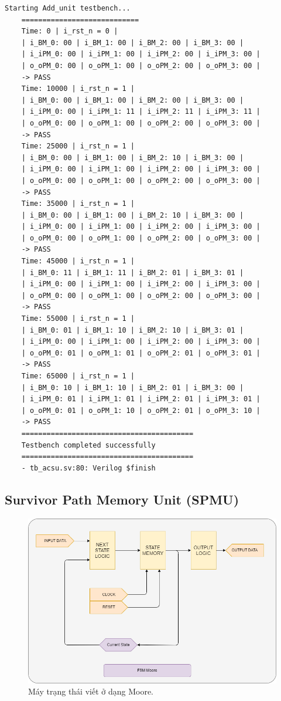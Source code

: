 \begin{lstlisting}[style=StyleResult, language=Result]
	Starting Add_unit testbench...
	============================
	Time: 0 | i_rst_n = 0 | 
	| i_BM_0: 00 | i_BM_1: 00 | i_BM_2: 00 | i_BM_3: 00 |
	| i_iPM_0: 00 | i_iPM_1: 00 | i_iPM_2: 00 | i_iPM_3: 00 |
	| o_oPM_0: 00 | o_oPM_1: 00 | o_oPM_2: 00 | o_oPM_3: 00 |
	-> PASS
	Time: 10000 | i_rst_n = 1 | 
	| i_BM_0: 00 | i_BM_1: 00 | i_BM_2: 00 | i_BM_3: 00 |
	| i_iPM_0: 00 | i_iPM_1: 11 | i_iPM_2: 11 | i_iPM_3: 11 |
	| o_oPM_0: 00 | o_oPM_1: 00 | o_oPM_2: 00 | o_oPM_3: 00 |
	-> PASS
	Time: 25000 | i_rst_n = 1 | 
	| i_BM_0: 00 | i_BM_1: 00 | i_BM_2: 10 | i_BM_3: 00 |
	| i_iPM_0: 00 | i_iPM_1: 00 | i_iPM_2: 00 | i_iPM_3: 00 |
	| o_oPM_0: 00 | o_oPM_1: 00 | o_oPM_2: 00 | o_oPM_3: 00 |
	-> PASS
	Time: 35000 | i_rst_n = 1 | 
	| i_BM_0: 00 | i_BM_1: 00 | i_BM_2: 10 | i_BM_3: 00 |
	| i_iPM_0: 00 | i_iPM_1: 00 | i_iPM_2: 00 | i_iPM_3: 00 |
	| o_oPM_0: 00 | o_oPM_1: 00 | o_oPM_2: 00 | o_oPM_3: 00 |
	-> PASS
	Time: 45000 | i_rst_n = 1 | 
	| i_BM_0: 11 | i_BM_1: 11 | i_BM_2: 01 | i_BM_3: 01 |
	| i_iPM_0: 00 | i_iPM_1: 00 | i_iPM_2: 00 | i_iPM_3: 00 |
	| o_oPM_0: 00 | o_oPM_1: 00 | o_oPM_2: 00 | o_oPM_3: 00 |
	-> PASS
	Time: 55000 | i_rst_n = 1 | 
	| i_BM_0: 01 | i_BM_1: 10 | i_BM_2: 10 | i_BM_3: 01 |
	| i_iPM_0: 00 | i_iPM_1: 00 | i_iPM_2: 00 | i_iPM_3: 00 |
	| o_oPM_0: 01 | o_oPM_1: 01 | o_oPM_2: 01 | o_oPM_3: 01 |
	-> PASS
	Time: 65000 | i_rst_n = 1 | 
	| i_BM_0: 10 | i_BM_1: 10 | i_BM_2: 01 | i_BM_3: 00 |
	| i_iPM_0: 01 | i_iPM_1: 01 | i_iPM_2: 01 | i_iPM_3: 01 |
	| o_oPM_0: 01 | o_oPM_1: 10 | o_oPM_2: 01 | o_oPM_3: 10 |
	-> PASS
	=========================================
	Testbench completed successfully
	=========================================
	- tb_acsu.sv:80: Verilog $finish
\end{lstlisting}

\subsection{Survivor Path Memory Unit (SPMU)}

\begin{figure}[H]
	\centering
	\includegraphics[width=.8\linewidth]{sections/pic/mophongbangSystemVerilog/FSM.png}
	\caption{Máy trạng thái viết ở dạng Moore.}
\end{figure}

